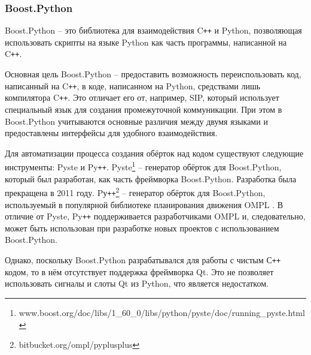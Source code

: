 \documentclass[14pt]{matmex-diploma-custom}
\begin{document}
\subsubsection{Boost.Python}
Boost.Python \cite{abrahams2003boost} -- это библиотека для взаимодействия C\texttt{++} и Python, позволяющая использовать скрипты на языке Python как часть программы, написанной на C\texttt{++}. 

Основная цель Boost.Python -- предоставить возможность переиспользовать код, написанный на C\texttt{++}, в коде, написанном на Python, средствами лишь компилятора C\texttt{++}. Это отличает его от, например, SIP, который использует специальный язык для создания промежуточной коммуникации. При этом в Boost.Python учитываются основные различия между двумя языками и предоставлены интерфейсы для удобного взаимодействия.

Для автоматизации процесса создания обёрток над кодом существуют следующие инструменты: Pyste и Py\texttt{++}. Pyste\footnote{www.boost.org/doc/libs/1\_60\_0/libs/python/pyste/doc/running\_pyste.html} -- генератор обёрток для Boost.Python, который был разработан, как часть фреймворка Boost.Python. Разработка была прекращена в 2011 году. Pу\texttt{++}\footnote{bitbucket.org/ompl/pyplusplus} -- генератор обёрток для Boost.Python, используемый в популярной библиотеке планирования движения OMPL \cite{sucan2012theOMPL}. В отличие от Pyste, Py\texttt{++} поддерживается разработчиками OMPL и, следовательно, может быть использован при разработке новых проектов с использованием Boost.Python.

Однако, поскольку Boost.Python разрабатывался для работы с чистым С\texttt{++} кодом, то в нём отсутствует поддержка фреймворка Qt. Это не позволяет использовать сигналы и слоты Qt из Python, что является недостатком. 


\end{document}
